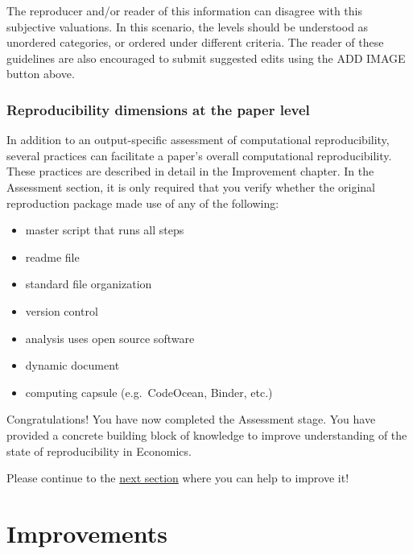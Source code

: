 \documentclass[]{book}
\providecommand{\tightlist}{%
  \setlength{\itemsep}{0pt}\setlength{\parskip}{0pt}}
\begin{document}
The reproducer and/or reader of this information can disagree with this subjective valuations. In this scenario, the levels should be understood as unordered categories, or ordered under different criteria. The reader of these guidelines are also encouraged to submit suggested edits using the ADD IMAGE button above.

\hypertarget{reproducibility-dimensions-at-the-paper-level}{%
\subsection{Reproducibility dimensions at the paper level}\label{reproducibility-dimensions-at-the-paper-level}}

In addition to an output-specific assessment of computational reproducibility, several practices can facilitate a paper's overall computational reproducibility. These practices are described in detail in the Improvement chapter. In the Assessment section, it is only required that you verify whether the original reproduction package made use of any of the following:

\begin{itemize}
\tightlist
\item
  master script that runs all steps
\item
  readme file
\item
  standard file organization\\
\item
  version control
\item
  analysis uses open source software\\
\item
  dynamic document\\
\item
  computing capsule (e.g.~CodeOcean, Binder, etc.)
\end{itemize}

Congratulations! You have now completed the Assessment stage. You have provided a concrete building block of knowledge to improve understanding of the state of reproducibility in Economics.

Please continue to the \protect\hyperlink{improvements}{next section} where you can help to improve it!

\hypertarget{improvements}{%
\chapter{Improvements}\label{improvements}}
\end{document}
